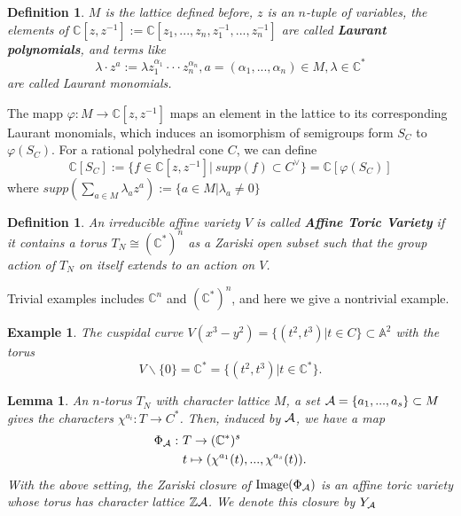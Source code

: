 \documentclass[11pt]{article}
\newtheorem{lemma}[thm]{Lemma}
\newtheorem{dfn}[thm]{Definition}
\newtheorem{ex}[thm]{Example}
\newcommand{\cplx}{\mathbb C}
\newcommand{\intg}{\mathbb Z}
\newcommand{\cala}{{\cal A}}
\begin{document}
\begin{dfn}
$M$ is the lattice defined before, $z$ is an $n$-tuple of variables, the elements of $\mathbb{C}[z,z^{-1}]:=\mathbb{C}[z_1,...,z_n,z_1^{-1},...,z_n^{-1}]$ are called \textbf{Laurant polynomials}, and terms like
\begin{equation*}
	\lambda\cdot z^a:=\lambda z_1^{\alpha_1}\cdot\cdot\cdot z_{n}^{\alpha_n}, a=(\alpha_1,...,\alpha_n)\in M, \lambda\in \mathbb{C^*}
\end{equation*}
are called Laurant monomials.
\end{dfn}

The mapp $\varphi: M\rightarrow \mathbb{C}[z,z^{-1}]$ maps an element in the lattice to its corresponding Laurant monomials, which induces an isomorphism of semigroups form $S_C$ to $\varphi(S_C)$. For a rational polyhedral cone $C$, we can define
\begin{equation*}
	\mathbb{C}[S_C]:=\{f\in \mathbb{C}[z,z^{-1}]|\ supp(f)\subset C^\vee\}=\cplx[\varphi(S_C)]
\end{equation*}
where 
$supp(\sum_{a\in M}\lambda_a z^a):=\{a\in M|\lambda_a\neq 0\}$

\begin{dfn}
An irreducible affine variety $V$ is called \textbf{Affine Toric Variety} if it contains a torus $T_N\cong \mathbb{(C^*)}^n$ as a Zariski open subset such that the group action of $T_{N}$ on itself extends to an action on $V$.
\end{dfn}

Trivial examples includes $\mathbb{C}^n$ and $\mathbb{(C^*)}^n$, and here we give a nontrivial example.

\begin{ex}
The cuspidal curve $V(x^3-y^2)=\{(t^2,t^3)| t\in C\}\subset\mathbb{A}^2$ with the torus
\begin{equation*}
	V\backslash\{0\}=\mathbb{C}^*=\{(t^2,t^3)|t\in \mathbb{C^*}\}.
\end{equation*}
\end{ex}

\begin{lemma}\label{A}
An $n$-torus $T_N$ with character lattice $M$, a set $\cala=\{a_1,...,a_s\}\subset M$ gives the characters $\chi^{a_i}:T\rightarrow C^*$. Then, induced by $\cala$, we  have a map 
\begin{equation*}
	\begin{aligned}
		\Phi_{\cala}:&\  T\rightarrow (\cplx^*)^s\\
					 &\  t\mapsto (\chi^{a_1}(t),...,\chi^{a_s}(t)).
	\end{aligned}
\end{equation*}
With the above setting, the Zariski closure of $\text{Image}(\Phi_\cala)$ is an affine toric variety whose torus has character lattice $\intg \cala$. We denote this closure by $Y_\cala$
\end{lemma}
\end{document}
